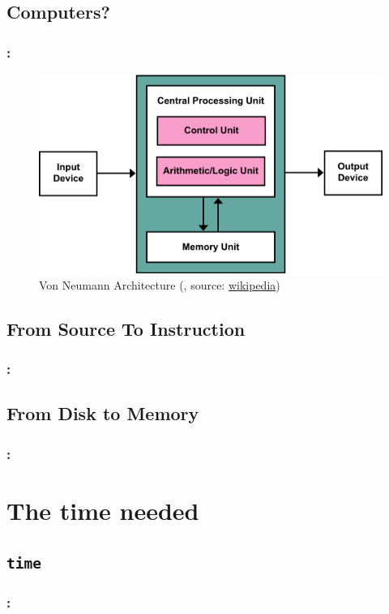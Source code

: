 \documentclass[9pt,xcolor=table]{beamer}
\begin{document}
\subsection{Computers?}
\begin{frame}[c]
\frametitle{\insertsectionhead{}: \insertsubsection{}}
\begin{figure}[htb]
\includegraphics[height=0.65\textheight]{img/Von_Neumann_Architecture}\\[12pt]\Large
Von Neumann Architecture (\cite{VonNeumann}, source: \href{http://en.wikipedia.org/wiki/Von_Neumann_architecture}{wikipedia})
\end{figure}
\end{frame}

\subsection{From Source To Instruction}
\begin{frame}
\frametitle{\insertsectionhead{}: \insertsubsection{}}
\end{frame}

\subsection{From Disk to Memory}
\begin{frame}
\frametitle{\insertsectionhead{}: \insertsubsection{}}
\end{frame}


\section[Measurement]{The time needed}
\subsection{\texttt{time}}
\begin{frame}
\frametitle{\insertsectionhead{}: \insertsubsectionhead{}}
\end{frame}
\end{document}

